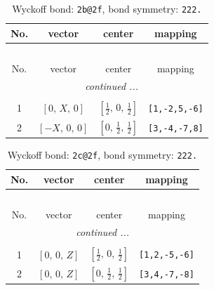 \documentclass[fleqn,8pt]{jsarticle}
\begin{document}
\renewcommand{\arraystretch}{1.2}
\begin{longtable}{cccc}
\caption{Wyckoff bond: {\tt 2b@2f}, bond symmetry: {\tt 222.}}
 \\
 \hline \hline
No. & vector & center & mapping \\ \hline \endfirsthead

\multicolumn{3}{l}{\tablename\ \thetable{}} \\
 \hline \hline
No. & vector & center & mapping \\ \hline \endhead

 \hline \hline
\multicolumn{3}{r}{\footnotesize\it continued ...} \\ \endfoot

 \hline \hline
\multicolumn{3}{r}{} \\ \endlastfoot

1 & $\left[ 0,\, X,\, 0 \right]$ & $\left[ \frac{1}{2},\, 0,\, \frac{1}{2} \right]$ & {\tt [1,-2,5,-6]} \\ \hline
2 & $\left[ - X,\, 0,\, 0 \right]$ & $\left[ 0,\, \frac{1}{2},\, \frac{1}{2} \right]$ & {\tt [3,-4,-7,8]} \\
\end{longtable}
\renewcommand{\arraystretch}{1.2}
\begin{longtable}{cccc}
\caption{Wyckoff bond: {\tt 2c@2f}, bond symmetry: {\tt 222.}}
 \\
 \hline \hline
No. & vector & center & mapping \\ \hline \endfirsthead

\multicolumn{3}{l}{\tablename\ \thetable{}} \\
 \hline \hline
No. & vector & center & mapping \\ \hline \endhead

 \hline \hline
\multicolumn{3}{r}{\footnotesize\it continued ...} \\ \endfoot

 \hline \hline
\multicolumn{3}{r}{} \\ \endlastfoot

1 & $\left[ 0,\, 0,\, Z \right]$ & $\left[ \frac{1}{2},\, 0,\, \frac{1}{2} \right]$ & {\tt [1,2,-5,-6]} \\ \hline
2 & $\left[ 0,\, 0,\, Z \right]$ & $\left[ 0,\, \frac{1}{2},\, \frac{1}{2} \right]$ & {\tt [3,4,-7,-8]} \\
\end{longtable}
\renewcommand{\arraystretch}{1.2}
\end{document}
